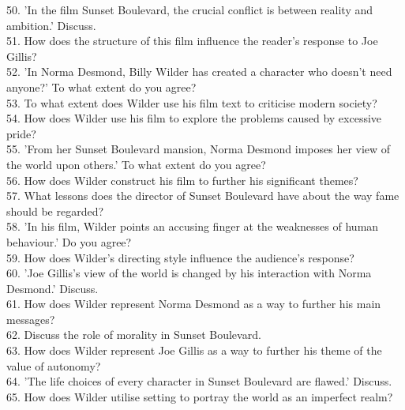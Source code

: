 \documentclass[a4paper]{article}
\begin{document}
50. 'In the film Sunset Boulevard, the crucial conflict is between reality and ambition.' Discuss.\\

51. How does the structure of this film influence the reader's response to Joe Gillis?\\

52. 'In Norma Desmond, Billy Wilder has created a character who doesn't need anyone?' To what extent do you agree?\\

53. To what extent does Wilder use his film text to criticise modern society?\\

54. How does Wilder use his film to explore the problems caused by excessive pride?\\

55. 'From her Sunset Boulevard mansion, Norma Desmond imposes her view of the world upon others.' To what extent do you agree?\\

56. How does Wilder construct his film to further his significant themes?\\

57. What lessons does the director of Sunset Boulevard have about the way fame should be regarded?\\

58. 'In his film, Wilder points an accusing finger at the weaknesses of human behaviour.' Do you agree?\\

59. How does Wilder's directing style influence the audience's response?\\

60. 'Joe Gillis's view of the world is changed by his interaction with Norma Desmond.' Discuss.\\

61. How does Wilder represent Norma Desmond as a way to further his main messages?\\

62. Discuss the role of morality in Sunset Boulevard.\\

63. How does Wilder represent Joe Gillis as a way to further his theme of the value of autonomy?\\

64. 'The life choices of every character in Sunset Boulevard are flawed.' Discuss.\\

65. How does Wilder utilise setting to portray the world as an imperfect realm?\\
\end{document}
